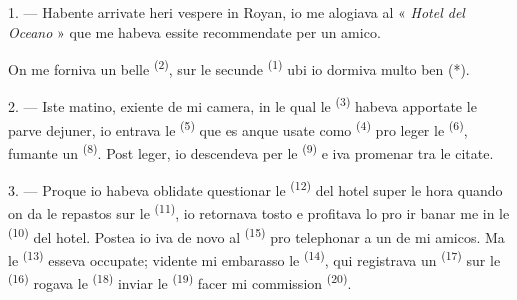 %


\VUsaut{3.0mm}
\VUsaut{1.6mm}
\VUsaut{2.0mm}
\VUsaut{3.4mm}

1. --- Habente arrivate heri vespere in Royan, io me alogiava al « \textit{Hotel
del Oceano} » que me habeva essite recommendate per un amico.

On me forniva un belle  \textsuperscript{(2)}, sur le secunde
 \textsuperscript{(1)} ubi io dormiva multo ben (*).

2. --- Iste matino, exiente de mi camera, in le qual le 
\textsuperscript{(3)} habeva apportate le parve dejuner, io entrava le
 \textsuperscript{(5)} que es anque usate como  \textsuperscript{(4)} pro leger le 
\textsuperscript{(6)}, fumante un  \textsuperscript{(8)}.
Post leger, io descendeva per le  \textsuperscript{(9)} e iva
promenar tra le citate.

3. --- Proque io habeva oblidate questionar le 
\textsuperscript{(12)} del hotel super le hora quando on da le repastos sur le
 \textsuperscript{(11)}, io retornava tosto e profitava lo
pro ir banar me in le  \textsuperscript{(10)} del hotel.
Postea io iva de novo al  \textsuperscript{(15)} pro telephonar a
un de mi amicos. Ma le  \textsuperscript{(13)} esseva occupate;
vidente mi embarasso le  \textsuperscript{(14)}, qui registrava
un  \textsuperscript{(17)} sur le 
\textsuperscript{(16)} rogava le  \textsuperscript{(18)} inviar
le  \textsuperscript{(19)} facer mi commission  \textsuperscript{(20)}.

